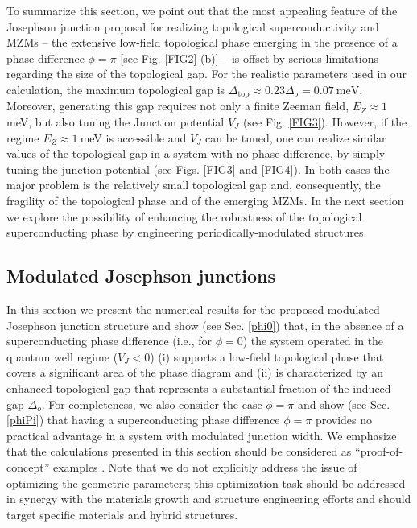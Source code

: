 \documentclass[twocolumn,aps,prb,nofootinbib]{revtex4-2}
\begin{document}
To summarize this section, we point out that the most appealing feature of the Josephson junction proposal for realizing topological superconductivity and MZMs -- the extensive low-field topological phase emerging in the presence of a phase difference $\phi=\pi$ [see Fig. \ref{FIG2} (b)] -- is offset by serious limitations regarding the size of the topological gap. For the realistic parameters used in our calculation, the maximum topological gap is $\Delta_{\text{top}} \approx 0.23 \Delta_o= 0.07~\text{meV}$. Moreover, generating this gap requires not only a finite Zeeman field, $E_Z\approx 1~$meV, but also tuning the Junction potential $V_J$ (see Fig. \ref{FIG3}). However, if the regime $E_Z\approx 1~$meV is accessible and $V_J$ can be tuned, one can realize similar values of the topological gap in a system with no phase difference, by simply tuning the junction potential (see Figs. \ref{FIG3} and \ref{FIG4}). In both cases the major problem is the relatively small topological gap and, consequently, the fragility of the topological phase and of the emerging MZMs. In the next section we explore the possibility of  enhancing the robustness of the topological superconducting phase by engineering periodically-modulated structures.    

\subsection{Modulated Josephson junctions}

In this section we present the numerical results for the proposed modulated Josephson junction structure and show (see Sec. \ref{phi0}) that, in the absence of a superconducting phase difference (i.e., for $\phi=0$) the system operated in the quantum well regime ($V_J <0$)  (i) supports a low-field topological phase that covers a significant area of the phase diagram and (ii) is characterized by an enhanced topological gap that represents a substantial fraction of the induced gap $\Delta_o$. For completeness, we also consider the case $\phi=\pi$ and show (see Sec. \ref{phiPi}) that having a superconducting phase difference $\phi=\pi$ provides no practical advantage in a system with modulated junction width. We emphasize that the calculations presented in this section should be considered as  ``proof-of-concept'' examples . Note that we do not explicitly address the issue of optimizing the geometric parameters; this optimization task should be addressed in synergy with the materials growth and structure engineering efforts and should target specific materials and hybrid structures. 
\end{document}
